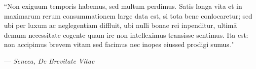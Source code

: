 \vspace*{\fill}
\begin{changemargin}{0.8in}{0.8in}
	\large
	\begin{center}
		\thispagestyle{empty}
		\addtolength{\textwidth}{-10.75in}
		``Non exiguum temporis habemus, sed multum perdimus. Satis longa vita et in maximarum rerum consummationem large data est, si tota bene conlocaretur; sed ubi per luxum ac neglegentiam diffluit, ubi nulli bonae rei inpenditur, ultimā demum necessitate cogente quam ire non intelleximus transisse sentimus. Ita est: non accipimus brevem vitam sed facimus nec inopes eiussed prodigi sumus."
		\begin{flushright}
			--- \textit{Seneca, De Brevitate Vitae}
		\end{flushright}
	\end{center}
\end{changemargin}
\vspace*{\fill}